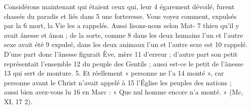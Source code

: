 Considérons maintenant qui étaient ceux qui, leur	 
4	 	égarement dévoilé, furent chassés du paradis et liés dans	 
5	 	une forteresse. Vous voyez comment, expulsés par la	 
6	 	mort, la Vie les a rappelés. Aussi lisons-nous selon Mat-	 
7	 	thieu qu'il y avait ânesse et ânon ; de la sorte, comme	 
8	 	dans les deux humains l'un et l'autre sexe avait été	 
9	 	expulsé, dans les deux animaux l'un et l'autre sexe est	 
10	 	rappelé. D'une part donc l'ânesse figurait Ève, mère	 
11	 	d'erreur ; d'autre part son petit représentait l'ensemble	 
12	 	du peuple des Gentils ; aussi est-ce le petit de l'ânesse	 
13	 	qui sert de monture. 5. Et réellement « personne ne l'a	 
14	 	monté », car personne avant le Christ n'avait appelé à	 
15	 	l'Église les peuples des nations ; aussi bien avez-vous lu	 
16	 	en Marc : « Que nul homme encore n'a monté. » (Mc, XI,	 
17	 	2).
